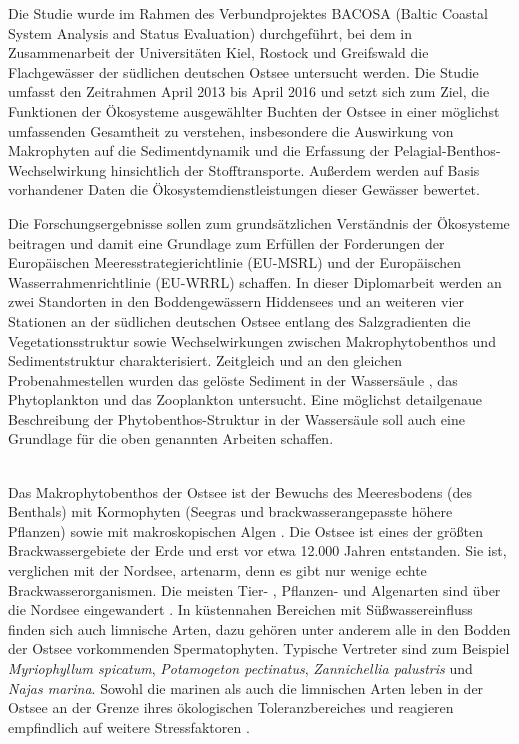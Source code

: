 Die Studie wurde im Rahmen des Verbundprojektes BACOSA (Baltic Coastal System Analysis and Status Evaluation) durchgeführt, bei dem in Zusammenarbeit der Universitäten Kiel, Rostock und Greifswald die Flachgewässer der südlichen deutschen Ostsee untersucht werden. Die Studie umfasst den Zeitrahmen April 2013 bis April 2016 und setzt sich zum Ziel, die Funktionen der Ökosysteme ausgewählter Buchten der Ostsee in einer möglichst umfassenden Gesamtheit zu verstehen, insbesondere die Auswirkung von Makrophyten auf die Sedimentdynamik und die Erfassung der Pelagial-Benthos-Wechselwirkung hinsichtlich der Stofftransporte. Außerdem werden auf Basis vorhandener Daten die Ökosystemdienstleistungen dieser Gewässer bewertet. 

Die Forschungsergebnisse sollen zum grundsätzlichen Verständnis der Ökosysteme beitragen und damit eine Grundlage zum Erfüllen der Forderungen der Europäischen Meeresstrategierichtlinie (EU-MSRL) und der Europäischen Wasserrahmenrichtlinie (EU-WRRL) schaffen. In dieser Diplomarbeit werden an zwei Standorten in den Boddengewässern Hiddensees und an weiteren vier Stationen an der südlichen deutschen Ostsee entlang des Salzgradienten die Vegetationsstruktur sowie Wechselwirkungen zwischen Makrophytobenthos und Sedimentstruktur charakterisiert. Zeitgleich und an den gleichen Probenahmestellen wurden das gelöste Sediment in der Wassersäule \citep{kafka_2014}, das Phytoplankton \citep{lindner_2014} und das Zooplankton \citep{nawka_2014} untersucht. Eine möglichst detailgenaue Beschreibung der Phytobenthos-Struktur in der Wassersäule soll auch eine Grundlage für die oben genannten Arbeiten schaffen.

\\
Das Makrophytobenthos der Ostsee ist der Bewuchs des Meeresbodens (des Benthals) mit Kormophyten (Seegras und brackwasserangepasste höhere Pflanzen) sowie mit makroskopischen Algen \citep{schwenke_1995}. Die Ostsee ist eines der größten Brackwassergebiete der Erde und erst vor etwa 12.000 Jahren entstanden. Sie ist, verglichen mit der Nordsee, artenarm, denn es gibt nur wenige echte Brackwasserorganismen. Die meisten Tier- , Pflanzen- und Algenarten sind über die Nordsee eingewandert \citep{rheinheimer_1995}. In küstennahen Bereichen mit Süßwassereinfluss finden sich auch limnische Arten, dazu gehören unter anderem alle in den Bodden der Ostsee vorkommenden Spermatophyten. Typische Vertreter sind zum Beispiel \textit{Myriophyllum spicatum}, \textit{Potamogeton pectinatus}, \textit{Zannichellia palustris} und \textit{Najas marina}. Sowohl die marinen als auch die limnischen Arten leben in der Ostsee an der Grenze ihres ökologischen Toleranzbereiches und reagieren empfindlich auf weitere Stressfaktoren \citep{rheinheimer_1995}.


